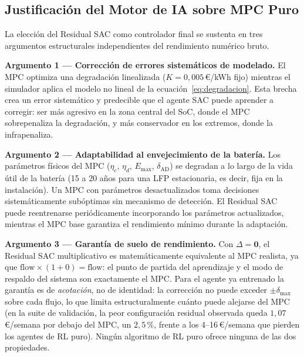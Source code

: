 \documentclass[12pt, a4paper, twoside]{report}
\begin{document}
\subsection{Justificación del Motor de IA sobre MPC Puro}
\label{sub:justificacion}

La elección del Residual SAC como controlador final se sustenta en tres
argumentos estructurales independientes del rendimiento numérico bruto.

\textbf{Argumento 1 — Corrección de errores sistemáticos de modelado.} El MPC
optimiza una degradación linealizada ($K = 0{,}005$\,€/kWh fijo) mientras el
simulador aplica el modelo no lineal de la ecuación~\eqref{eq:degradacion}.
Esta brecha crea un error sistemático y predecible que el agente SAC puede
aprender a corregir: ser más agresivo en la zona central del SoC, donde el MPC
sobrepenaliza la degradación, y más conservador en los extremos, donde la
infrapenaliza.

\textbf{Argumento 2 — Adaptabilidad al envejecimiento de la batería.} Los
parámetros físicos del MPC ($\eta_c$, $\eta_d$, $E_{\max}$, $\delta_{\text{AD}}$)
se degradan a lo largo de la vida útil de la batería (15 a 20 años para una
LFP estacionaria, es decir, fija en la instalación). Un
MPC con parámetros desactualizados toma decisiones sistemáticamente subóptimas
sin mecanismo de detección. El Residual SAC puede reentrenarse periódicamente
incorporando los parámetros actualizados, mientras el MPC base garantiza el
rendimiento mínimo durante la adaptación.

\textbf{Argumento 3 — Garantía de suelo de rendimiento.} Con $\Delta = \mathbf{0}$,
el Residual SAC multiplicativo es matemáticamente equivalente al MPC realista,
ya que $\text{flow} \times (1 + 0) = \text{flow}$: el punto de partida del
aprendizaje y el modo de respaldo del sistema son exactamente el MPC. Para el
agente ya entrenado la garantía es de \emph{acotación}, no de identidad: la
corrección no puede exceder $\pm\delta_{\max}$ sobre cada flujo, lo que limita
estructuralmente cuánto puede alejarse del MPC (en la suite de validación, la
peor configuración residual observada queda $1{,}07$\,€/semana por debajo del
MPC, un $2{,}5\,\%$, frente a los 4--16\,€/semana que pierden los agentes de
RL puro). Ningún algoritmo de RL puro ofrece ninguna de las dos propiedades.
\end{document}

